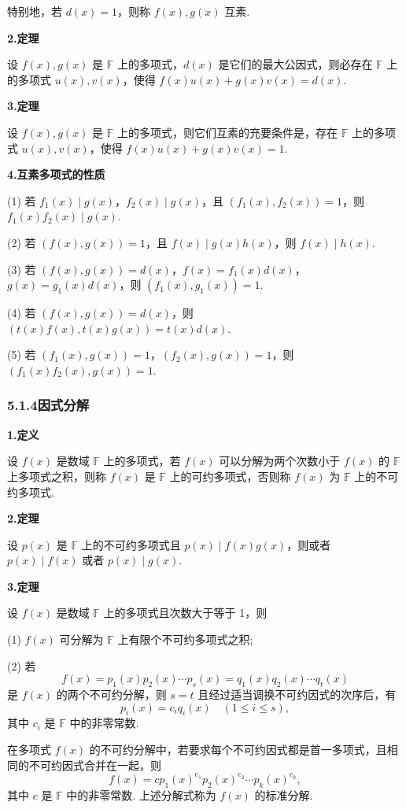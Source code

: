 \documentclass[UTF8, 12pt, fontset=fandol, oneside]{ctexart}
\begin{document}
特别地，若 $d(x)=1$，则称 $f(x),g(x)$ 互素.

\noindent\textbf{2.\quad 定理}

设 $f(x),g(x)$ 是 $\mathbb{F}$ 上的多项式，$d(x)$ 是它们的最大公因式，则必存在 $\mathbb{F}$ 上的多项式 $u(x),v(x)$，使得 $f(x)u(x)+g(x)v(x)=d(x)$.

\noindent\textbf{3.\quad 定理}

设 $f(x),g(x)$ 是 $\mathbb{F}$ 上的多项式，则它们互素的充要条件是，存在 $\mathbb{F}$ 上的多项式 $u(x),v(x)$，使得 $f(x)u(x)+g(x)v(x)=1$.

\noindent\textbf{4.\quad 互素多项式的性质}

(1) 若 $f_1(x)\mid g(x)$，$f_2(x)\mid g(x)$，且 $(f_1(x),f_2(x))=1$，则 $f_1(x)f_2(x)\mid g(x)$.

(2) 若 $(f(x),g(x))=1$，且 $f(x)\mid g(x)h(x)$，则 $f(x)\mid h(x)$.

(3) 若 $(f(x),g(x))=d(x)$，$f(x)=f_1(x)d(x)$，$g(x)=g_1(x)d(x)$，则 $(f_1(x),g_1(x))=1$.

(4) 若 $(f(x),g(x))=d(x)$，则 $(t(x)f(x),t(x)g(x))=t(x)d(x)$.

(5) 若 $(f_1(x),g(x))=1$，$(f_2(x),g(x))=1$，则 $(f_1(x)f_2(x),g(x))=1$.

\subsubsection*{5.1.4\quad 因式分解}

\noindent\textbf{1.\quad 定义}

设 $f(x)$ 是数域 $\mathbb{F}$ 上的多项式，若 $f(x)$ 可以分解为两个次数小于 $f(x)$ 的 $\mathbb{F}$ 上多项式之积，则称 $f(x)$ 是 $\mathbb{F}$ 上的可约多项式，否则称 $f(x)$ 为 $\mathbb{F}$ 上的不可约多项式.

\noindent\textbf{2.\quad 定理}

设 $p(x)$ 是 $\mathbb{F}$ 上的不可约多项式且 $p(x)\mid f(x)g(x)$，则或者 $p(x)\mid f(x)$ 或者 $p(x)\mid g(x)$.

\noindent\textbf{3.\quad 定理}

设 $f(x)$ 是数域 $\mathbb{F}$ 上的多项式且次数大于等于 1，则

(1) $f(x)$ 可分解为 $\mathbb{F}$ 上有限个不可约多项式之积;

(2) 若
\[
f(x)=p_1(x)p_2(x)\cdots p_s(x)=q_1(x)q_2(x)\cdots q_t(x)
\]
是 $f(x)$ 的两个不可约分解，则 $s=t$ 且经过适当调换不可约因式的次序后，有
\[
p_i(x)=c_iq_i(x)\quad (1\le i\le s),
\]
其中 $c_i$ 是 $\mathbb{F}$ 中的非零常数.

在多项式 $f(x)$ 的不可约分解中，若要求每个不可约因式都是首一多项式，且相同的不可约因式合并在一起，则
\[
f(x)=cp_1(x)^{e_1}p_2(x)^{e_2}\cdots p_k(x)^{e_k},
\]
其中 $c$ 是 $\mathbb{F}$ 中的非零常数. 上述分解式称为 $f(x)$ 的标准分解.
\end{document}

